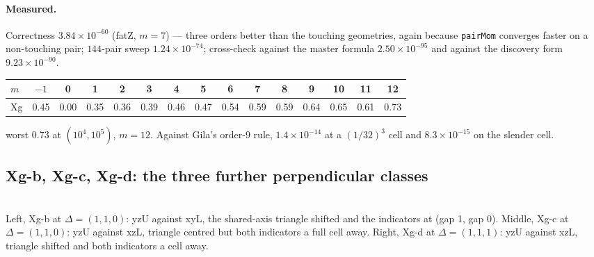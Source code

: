 \documentclass[11pt]{article}
\theoremstyle{remark}
\newcommand{\code}[1]{\texttt{#1}}
\newcommand{\geofig}[2]{\begin{center}#1\\[2pt]{\footnotesize #2}\end{center}}
\begin{document}
\paragraph{Measured.} Correctness $3.84\times10^{-60}$ (fatZ, $m=7$) --- three orders
better than the touching geometries, again because \code{pairMom} converges faster on a
non-touching pair; $144$-pair sweep $1.24\times10^{-74}$; cross-check against the master
formula $2.50\times10^{-95}$ and against the discovery form $9.23\times10^{-90}$.

\begin{center}\small
\begin{tabular}{@{}lcccccccccccccc@{}}
\toprule
$m$ & $-1$ & 0 & 1 & 2 & 3 & 4 & 5 & 6 & 7 & 8 & 9 & 10 & 11 & 12\\
\midrule
Xg & 0.45 & 0.00 & 0.35 & 0.36 & 0.39 & 0.46 & 0.47 & 0.54 & 0.59 & 0.59 & 0.64 & 0.65 & 0.61 & 0.73\\
\bottomrule
\end{tabular}
\end{center}
\noindent
worst $0.73$ at $(10^{4}, 10^{5})$, $m = 12$. Against Gila's order-9 rule,
$1.4\times10^{-14}$ at a $(1/32)^3$ cell and $8.3\times10^{-15}$ on the slender cell.

\subsection{Xg-b, Xg-c, Xg-d: the three further perpendicular classes}
\label{sec:Xgbcd}

\geofig{\scalebox{0.9}{\figXgb}\hspace{1mm}\scalebox{0.9}{\figXgc}\hspace{1mm}\scalebox{0.9}{\figXgd}}{Left, Xg-b at $\Delta = (1,1,0)$: yzU against
xyL, the shared-axis triangle shifted and the indicators at (gap 1, gap 0). Middle, Xg-c at
$\Delta = (1,1,0)$: yzU against xzL, triangle centred but both indicators a full cell away.
Right, Xg-d at $\Delta = (1,1,1)$: yzU against xzL, triangle shifted and both indicators a
cell away.}
\end{document}
